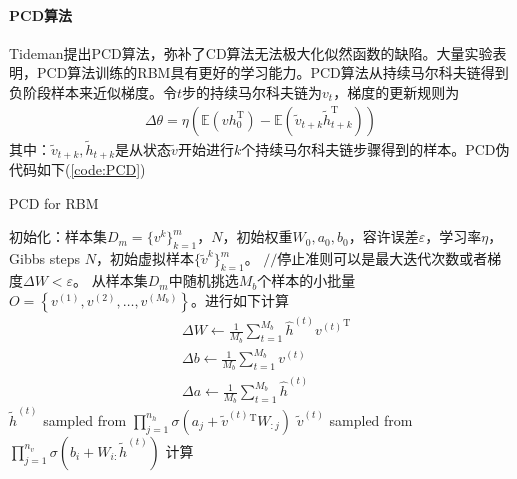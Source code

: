             \paragraph{PCD算法} Tideman提出PCD算法，弥补了CD算法无法极大化似然函数的缺陷。大量实验表明，PCD算法训练的RBM具有更好的学习能力。PCD算法从持续马尔科夫链得到负阶段样本来近似梯度。令$t$步的持续马尔科夫链为$v_t$，梯度的更新规则为
            \begin{align*}
            \Delta \theta = \eta \left( \mathbb{E}(vh_0^\mathrm{T}) - \mathbb{E}(\tilde{v}_{t+k} \tilde{ h}_{t+k}^\mathrm{T}) \right)
            \end{align*}
            其中：$\tilde{v}_{t+k},\tilde{h}_{t+k}$是从状态$\tilde{v}$开始进行$k$个持续马尔科夫链步骤得到的样本。PCD伪代码如下(\ref{code:PCD})
            \begin{algorithm}[htbp]
                \caption{PCD for RBM}\label{code:PCD}
                \begin{algorithmic}[1]
                    \State 初始化：样本集$D_m = \{v^k\}_{k=1}^m$，$N$，初始权重$W_0,a_0,b_0$，容许误差$\varepsilon$，学习率$\eta$，Gibbs steps $N$，初始虚拟样本$\{\tilde{v}^k\}_{k=1}^m$。
                        \State $//$停止准则可以是最大迭代次数或者梯度$\Delta W < \varepsilon$。
                        \State 从样本集$D_m$中随机挑选$M_b$个样本的小批量$O = \left\{v^{(1)},v^{(2)},\dots,v^{(M_b)}\right\}$。进行如下计算
                        \begin{align*}
                        & \Delta W \leftarrow \frac{1}{M_b}\sum_{t=1}^{M_b}\hat{h}^{(t)}{v^{(t)}}^\mathrm{T}\\
                        & \Delta b \leftarrow \frac{1}{M_b}\sum_{t=1}^{M_b}v^{(t)}\\
                        & \Delta a \leftarrow \frac{1}{M_b}\sum_{t=1}^{M_b}\hat{h}^{(t)}
                        \end{align*}
                                \State $\tilde{h}^{(t)}$ sampled from
                                $\prod_{j=1}^{n_h}\sigma \left( a_j+\tilde{v}^{(t)}{}^\mathrm{T} W_{:j} \right) $
                                \State $\tilde{v}^{(t)}$ sampled from
                                $\prod_{j=1}^{n_v}\sigma \left( b_i+W_{i:}\tilde{h}^{(t)} \right) $
                            \EndFor
                        \EndFor
                        \State 计算
                        \begin{align*}

\end{align*}
\end{algorithmic}
\end{algorithm}
